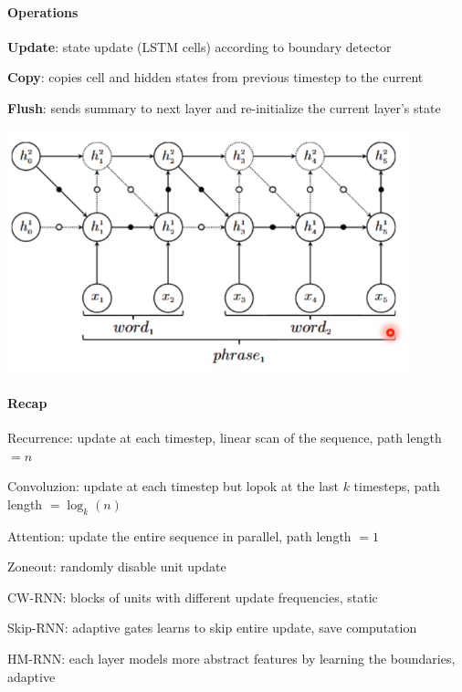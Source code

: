 \documentclass[10pt]{report}
\begin{document}
\paragraph{Operations}\begin{list}{}{}
	\item \textbf{Update}: state update (LSTM cells) according to boundary detector
	\item \textbf{Copy}: copies cell and hidden states from previous timestep to the current
	\item \textbf{Flush}: sends summary to next layer and re-initialize the current layer's state
\end{list}
\begin{center}
	\includegraphics[scale=0.5]{126.png}
\end{center}
\paragraph{Recap}\begin{list}{}{}
	\item Recurrence: update at each timestep, linear scan of the sequence, path length $=n$
	\item Convoluzion: update at each timestep but lopok at the last $k$ timesteps, path length $=\log_k(n)$
	\item Attention: update the entire sequence in parallel, path length $=1$
	\item Zoneout: randomly disable unit update
	\item CW-RNN: blocks of units with different update frequencies, static
	\item Skip-RNN: adaptive gates learns to skip entire update, save computation
	\item HM-RNN: each layer models more abstract features by learning the boundaries, adaptive
\end{list}
\end{document}
